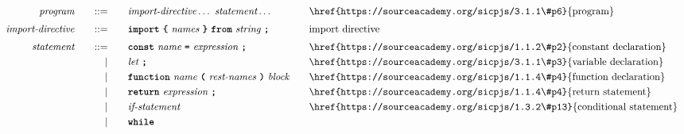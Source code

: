\begin{alignat*}{9}
&& \textit{program}    &&\quad ::= &\quad && \textit{import-directive} \ldots \ \textit{statement} \ldots
                                                           && \textrm{\href{https://sourceacademy.org/sicpjs/3.1.1\#p6}{program}} \\[1mm]
&& \textit{import-directive}    &&\quad ::= &\quad && \textbf{\texttt{import}}\ \textbf{\texttt{\{}}\ \textit{names} \ \textbf{\texttt{\}}}\ \textbf{\texttt{from}}\  \textit{string} \ \textbf{\texttt{;}}
                                                           && \textrm{import directive} \\[1mm]
&& \textit{statement}    &&\quad ::= &\quad && \textbf{\texttt{const}}\  \textit{name} \ 
                                           \textbf{\texttt{=}}\  \textit{expression} \ \textbf{\texttt{;}}
                                                           && \textrm{\href{https://sourceacademy.org/sicpjs/1.1.2\#p2}{constant declaration}} \\
&&                       && |   &\quad && \textit{let} \ \textbf{\texttt{;}}
                                                           && \textrm{\href{https://sourceacademy.org/sicpjs/3.1.1\#p3}{variable declaration}} \\
&&                       && |   &\quad && \textbf{\texttt{function}}\  \textit{name} \ 
                                   \textbf{\texttt{(}}\  \textit{rest-names} \ \textbf{\texttt{)}}\ \textit{block} \quad
                                                           && \textrm{\href{https://sourceacademy.org/sicpjs/1.1.4\#p4}{function declaration}}\\
&&                       && |   &\quad && \textbf{\texttt{return}}\  \textit{expression} \ \textbf{\texttt{;}}
                                                           && \textrm{\href{https://sourceacademy.org/sicpjs/1.1.4\#p4}{return statement}}\\
&&                       && |   &\quad && \textit{if-statement} \quad
                                                           && \textrm{\href{https://sourceacademy.org/sicpjs/1.3.2\#p13}{conditional statement}}\\
&&                       && |   &\quad && \textbf{\texttt{while}}\  

\end{alignat*}
